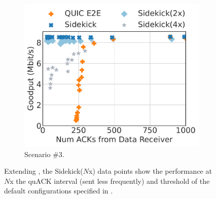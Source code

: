 \begin{figure}
\hfill
\begin{subfigure}{0.32\textwidth}
\includegraphics[width=0.99\linewidth]{sidekick/figures/fig4c_ack_reduction_quack.pdf}
\caption{Scenario \#3.}
\label{fig:sidekick:quack-interval:ack-reduction}
\end{subfigure}
\caption{Extending ,
the \textsf{Sidekick($N$x)} data points show
the performance at $N$x the quACK interval (sent less frequently) and
threshold of the default configurations specified in
.
}
\label{fig:sidekick:quack-interval}
\end{figure}

